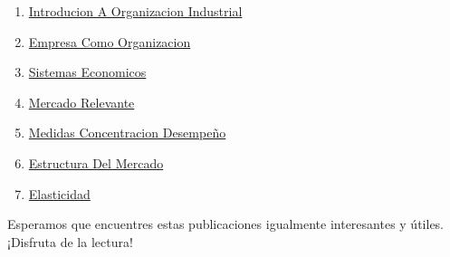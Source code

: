 \documentclass[
  jou,
  floatsintext,
  longtable,
  a4paper,
  nolmodern,
  notxfonts,
  notimes,
  colorlinks=true,linkcolor=blue,citecolor=blue,urlcolor=blue]{apa7}
\providecommand{\tightlist}{%
  \setlength{\itemsep}{0pt}\setlength{\parskip}{0pt}}
\begin{document}
\begin{enumerate}
\def\labelenumi{\arabic{enumi}.}
\tightlist
\item
  \href{https://achalmaedison.netlify.app/microeconomia/organizacion-industrial/2023-06-12-introducion-a-organizacion-industrial/index.pdf}{}
  \href{https://achalmaedison.netlify.app/microeconomia/organizacion-industrial/2023-06-12-introducion-a-organizacion-industrial}{Introducion
  A Organizacion Industrial}
\item
  \href{https://achalmaedison.netlify.app/microeconomia/organizacion-industrial/2023-06-13-empresa-como-organizacion/index.pdf}{}
  \href{https://achalmaedison.netlify.app/microeconomia/organizacion-industrial/2023-06-13-empresa-como-organizacion}{Empresa
  Como Organizacion}
\item
  \href{https://achalmaedison.netlify.app/microeconomia/organizacion-industrial/2023-06-13-sistemas-economicos/index.pdf}{}
  \href{https://achalmaedison.netlify.app/microeconomia/organizacion-industrial/2023-06-13-sistemas-economicos}{Sistemas
  Economicos}
\item
  \href{https://achalmaedison.netlify.app/microeconomia/organizacion-industrial/2023-06-15-mercado-relevante/index.pdf}{}
  \href{https://achalmaedison.netlify.app/microeconomia/organizacion-industrial/2023-06-15-mercado-relevante}{Mercado
  Relevante}
\item
  \href{https://achalmaedison.netlify.app/microeconomia/organizacion-industrial/2023-06-16-medidas-concentracion-desempeño/index.pdf}{}
  \href{https://achalmaedison.netlify.app/microeconomia/organizacion-industrial/2023-06-16-medidas-concentracion-desempeño}{Medidas
  Concentracion Desempeño}
\item
  \href{https://achalmaedison.netlify.app/microeconomia/organizacion-industrial/2023-06-17-estructura-del-mercado/index.pdf}{}
  \href{https://achalmaedison.netlify.app/microeconomia/organizacion-industrial/2023-06-17-estructura-del-mercado}{Estructura
  Del Mercado}
\item
  \href{https://achalmaedison.netlify.app/microeconomia/organizacion-industrial/2023-06-23-elasticidad/index.pdf}{}
  \href{https://achalmaedison.netlify.app/microeconomia/organizacion-industrial/2023-06-23-elasticidad}{Elasticidad}
\end{enumerate}

Esperamos que encuentres estas publicaciones igualmente interesantes y
útiles. ¡Disfruta de la lectura!
\end{document}
